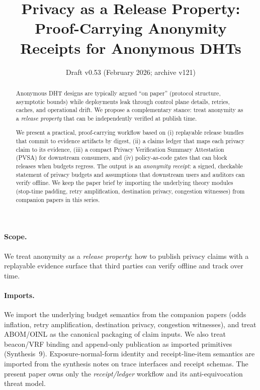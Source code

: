 \documentclass[11pt]{article}
\title{Privacy as a Release Property:\\
Proof-Carrying Anonymity Receipts for Anonymous DHTs}
\author{}
\date{Draft v0.53 (February 2026; archive v121)}
\begin{document}
\maketitle

\begin{abstract}
Anonymous DHT designs are typically argued ``on paper'' (protocol structure, asymptotic bounds) while deployments leak through control plane details, retries, caches, and operational drift.
We propose a complementary stance: treat anonymity as a \emph{release property} that can be independently verified at publish time.

We present a practical, proof-carrying workflow based on (i) replayable release bundles that commit to evidence artifacts by digest, (ii) a claims ledger that maps each privacy claim to its evidence, (iii) a compact Privacy Verification Summary Attestation (PVSA) for downstream consumers, and (iv) policy-as-code gates that can block releases when budgets regress.
The output is an \emph{anonymity receipt}: a signed, checkable statement of privacy budgets and assumptions that downstream users and auditors can verify offline.
We keep the paper brief by importing the underlying theory modules (stop-time padding, retry amplification, destination privacy, congestion witnesses) from companion papers in this series.
\end{abstract}

\paragraph{Scope.}
We treat anonymity as a \emph{release property}: how to publish privacy claims with a replayable evidence surface that third parties can verify offline and track over time.

\paragraph{Imports.}
We import the underlying budget semantics from the companion papers (odds inflation, retry amplification, destination privacy, congestion witnesses), and treat ABOM/OINL as the canonical packaging of claim inputs.\cite{series:oddsinflation,series:abomoinl}
We also treat beacon/VRF binding and append-only publication as imported primitives (Synthesis~9).\cite{series:transparencyprimitives}
Exposure-normal-form identity and receipt-line-item semantics are imported from the synthesis notes on trace interfaces and receipt schemas.\cite{series:traceifaces,series:receiptitems}
The present paper owns only the \emph{receipt/ledger} workflow and its anti-equivocation threat model.
\end{document}
